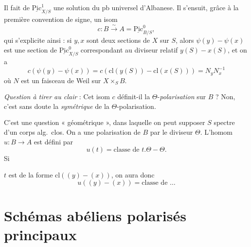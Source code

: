 \documentclass[11pt,a4paper]{article}
\begin{document}


Il fait de $\underline{\mathrm{Pic}}^{1}_{X/S}$ une solution du pb universel
d'Albanese. Il s'ensuit, grâce à la première convention de signe, un isom
\[
  c : B \xrightarrow{\ \sim\ } A = \underline{\mathrm{Pic}}^{0}_{B/S} ,
\]
qui s'explicite ainsi : si $y, x$ sont deux sections de $X$ sur $S$, alors
$\psi(y) - \psi(x)$ est une section de $\underline{\mathrm{Pic}}^{0}_{X/S}$
correspondant au diviseur relatif $y(S) - x(S)$, et on a
\[
  c(\psi(y) - \psi(x)) = c(\mathrm{cl}(y(S)) - \mathrm{cl}(x(S))) = N_y N_x^{-1}
\]
où $N$ est un faisceau de Weil sur $X \times_S B$.

\emph{Question à tirer au clair} : Cet isom $c$ définit-il la \struck{\ill{}}
$\Theta$-\emph{polarisation} sur $B$ ? 
Non, c'est sans doute la \emph{symétrique}  de la $\Theta$-polarisation.

C'est une question « géométrique », dans laquelle on peut supposer $S$
spectre d'un corps alg.\ clos. On a une polarisation de $B$ par le diviseur
$\Theta$. L'homom  $u : B \to A$ est défini par
\[
  u(t) = \text{classe de } t.\Theta - \Theta .
\]
Si


$t$ est de la forme $\mathrm{cl}((y) - (x))$, on aura donc
\[
  u((y) - (x)) = \text{classe de } \ldots
\]
\struck{\ill{}}


\section*{Schémas abéliens polarisés principaux}
\end{document}
